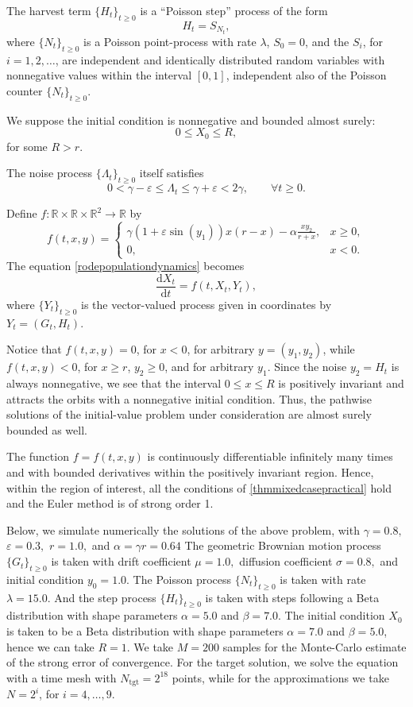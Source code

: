 \documentclass[reqno,12pt]{amsart}
\theoremstyle{plain} %
\theoremstyle{definition} %
\begin{document}
The harvest term $\{H_t\}_{t\geq 0}$ is a ``Poisson step'' process of the form
\[
    H_t = S_{N_t},
\]
where $\{N_t\}_{t\geq 0}$ is a Poisson point-process with rate $\lambda$, $S_0 = 0$, and the $S_i$, for $i=1, 2, \ldots$, are independent and identically distributed random variables with nonnegative values within the interval $[0, 1]$, independent also of the Poisson counter $\{N_t\}_{t\geq 0}$.

We suppose the initial condition is nonnegative and bounded almost surely:
\[
    0 \leq X_0 \leq R,
\]
for some $R > r$.

The noise process $\{\Lambda_t\}_{t \geq 0}$ itself satisfies
\[
    0 < \gamma - \varepsilon \leq \Lambda_t \leq \gamma + \varepsilon < 2\gamma, \qquad \forall t \geq 0.
\]

Define $f:\mathbb{R} \times \mathbb{R} \times \mathbb{R}^2 \rightarrow \mathbb{R}$ by
\[
    f(t, x, y) = \begin{cases}
        \displaystyle \gamma (1 + \varepsilon \sin(y_1)) x(r - x) - \alpha \frac{xy_2}{r + x}, & x \geq 0, \\
        0, & x < 0.
    \end{cases}
\]
The equation \eqref{rodepopulationdynamics} becomes
\[
    \frac{\mathrm{d}X_t}{\mathrm{d}t} = f(t, X_t, Y_t),
\]
where $\{Y_t\}_{t\geq 0}$ is the vector-valued process given in coordinates by $Y_t = (G_t, H_t)$.

Notice that $f(t, x, y) = 0$, for $x < 0$, for arbitrary $y=(y_1, y_2)$, while $f(t, x, y) < 0$, for $x \geq r$, $y_2 \geq 0$, and for arbitrary $y_1$. Since the noise $y_2 = H_t$ is always nonnegative, we see that the interval $0 \leq x \leq R$ is positively invariant and attracts the orbits with a nonnegative initial condition. Thus, the pathwise solutions of the initial-value problem under consideration are almost surely bounded as well.

The function $f=f(t, x, y)$ is continuously differentiable infinitely many times and with bounded derivatives within the positively invariant region. Hence, within the region of interest, all the conditions of \cref{thmmixedcasepractical} hold and the Euler method is of strong order 1.

Below, we simulate numerically the solutions of the above problem, with $\gamma = 0.8,$ $\varepsilon = 0.3,$ $r = 1.0,$ and $\alpha = \gamma r = 0.64$ The geometric Brownian motion process $\{G_t\}_{t\geq 0}$ is taken with drift coefficient $\mu = 1.0,$ diffusion coefficient $\sigma = 0.8,$ and initial condition $y_0 = 1.0.$ The Poisson process $\{N_t\}_{t \geq 0}$ is taken with rate $\lambda = 15.0$. And the step process $\{H_t\}_{t \geq 0}$ is taken with steps following a Beta distribution with shape parameters $\alpha = 5.0$ and $\beta = 7.0$. The initial condition $X_0$ is taken to be a Beta distribution with shape parameters $\alpha = 7.0$ and $\beta = 5.0$, hence we can take $R = 1$. We take $M = 200$ samples for the Monte-Carlo estimate of the strong error of convergence. For the target solution, we solve the equation with a time mesh with $N_{\mathrm{tgt}} = 2^{18}$ points, while for the approximations we take $N = 2^i$, for $i=4, \ldots, 9$.
\end{document}
